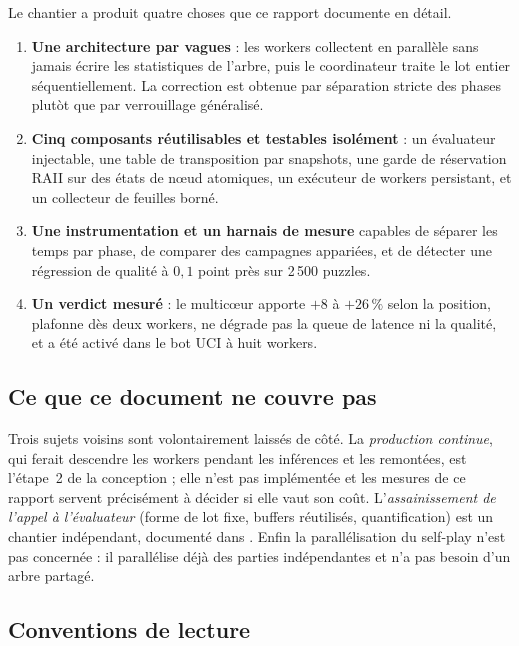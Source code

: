 Le chantier a produit quatre choses que ce rapport documente en d\'etail.

\begin{enumerate}[leftmargin=1.4em]
  \item \textbf{Une architecture par vagues} : les workers collectent en
  parall\`ele sans jamais \'ecrire les statistiques de l'arbre, puis le
  coordinateur traite le lot entier s\'equentiellement. La correction est
  obtenue par s\'eparation stricte des phases plut\`ot que par verrouillage
  g\'en\'eralis\'e.
  \item \textbf{Cinq composants r\'eutilisables et testables isol\'ement} :
  un \'evaluateur injectable, une table de transposition par snapshots, une
  garde de r\'eservation RAII sur des \'etats de n\oe{}ud atomiques, un
  ex\'ecuteur de workers persistant, et un collecteur de feuilles born\'e.
  \item \textbf{Une instrumentation et un harnais de mesure} capables de
  s\'eparer les temps par phase, de comparer des campagnes appari\'ees, et de
  d\'etecter une r\'egression de qualit\'e \`a $0,1$ point pr\`es sur
  2\,500 puzzles.
  \item \textbf{Un verdict mesur\'e} : le multic\oe{}ur apporte $+8$ \`a
  $+26\,\%$ selon la position, plafonne d\`es deux workers, ne d\'egrade pas la
  queue de latence ni la qualit\'e, et a \'et\'e activ\'e dans le bot UCI \`a
  huit workers.
\end{enumerate}

\subsection{Ce que ce document ne couvre pas}

Trois sujets voisins sont volontairement laiss\'es de c\^ot\'e. La
\emph{production continue}, qui ferait descendre les workers pendant les
inf\'erences et les remont\'ees, est l'\'etape~2 de la conception ; elle n'est
pas impl\'ement\'ee et les mesures de ce rapport servent pr\'ecis\'ement \`a
d\'ecider si elle vaut son co\^ut. L'\emph{assainissement de l'appel \`a
l'\'evaluateur} (forme de lot fixe, buffers r\'eutilis\'es, quantification) est
un chantier ind\'ependant, document\'e dans
. Enfin la parall\'elisation du
self-play n'est pas concern\'ee : il parall\'elise d\'ej\`a des parties
ind\'ependantes et n'a pas besoin d'un arbre partag\'e.

\subsection{Conventions de lecture}

